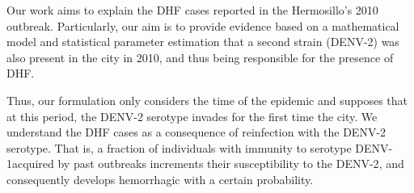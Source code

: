     Our work aims to explain the \ac{DHF} cases reported in the Hermosillo's 
2010 outbreak. Particularly, our aim is to provide evidence based on a mathematical model and statistical 
parameter estimation that a second strain (DENV-2) was also present in the city in 2010, and thus being responsible for the presence of DHF. 

Thus, our formulation only considers the time of the epidemic and
supposes that at this period, the \ac{DENV-2} serotype invades for the first 
time the city. We understand the \ac{DHF} cases as a consequence of reinfection 
with the \ac{DENV-2} serotype. That is, a fraction of individuals with immunity 
to serotype \ac{DENV-1}\textemdash acquired by past outbreaks\textemdash 
increments their susceptibility to the \ac{DENV-2}, and consequently 
develops hemorrhagic with a certain probability.

